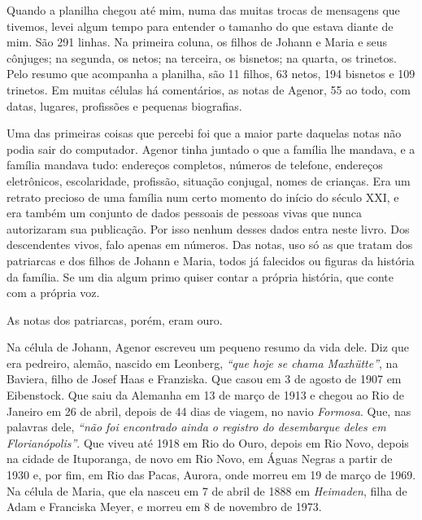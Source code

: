 \documentclass[
  brazilian,
  11pt,
  openany]{book}
\begin{document}
Quando a planilha chegou até mim, numa das muitas trocas de mensagens
que tivemos, levei algum tempo para entender o tamanho do que estava
diante de mim. São 291 linhas. Na primeira coluna, os filhos de Johann e
Maria e seus cônjuges; na segunda, os netos; na terceira, os bisnetos;
na quarta, os trinetos. Pelo resumo que acompanha a planilha, são 11
filhos, 63 netos, 194 bisnetos e 109 trinetos. Em muitas células há
comentários, as notas de Agenor, 55 ao todo, com datas, lugares,
profissões e pequenas biografias.

Uma das primeiras coisas que percebi foi que a maior parte daquelas
notas não podia sair do computador. Agenor tinha juntado o que a família
lhe mandava, e a família mandava tudo: endereços completos, números de
telefone, endereços eletrônicos, escolaridade, profissão, situação
conjugal, nomes de crianças. Era um retrato precioso de uma família num
certo momento do início do século XXI, e era também um conjunto de dados
pessoais de pessoas vivas que nunca autorizaram sua publicação. Por isso
nenhum desses dados entra neste livro. Dos descendentes vivos, falo
apenas em números. Das notas, uso só as que tratam dos patriarcas e dos
filhos de Johann e Maria, todos já falecidos ou figuras da história da
família. Se um dia algum primo quiser contar a própria história, que
conte com a própria voz.

As notas dos patriarcas, porém, eram ouro.

Na célula de Johann, Agenor escreveu um pequeno resumo da vida dele. Diz
que era pedreiro, alemão, nascido em Leonberg, \emph{``que hoje se chama
Maxhütte''}, na Baviera, filho de Josef Haas e Franziska. Que casou em 3
de agosto de 1907 em Eibenstock. Que saiu da Alemanha em 13 de março de
1913 e chegou ao Rio de Janeiro em 26 de abril, depois de 44 dias de
viagem, no navio \emph{Formosa}. Que, nas palavras dele, \emph{``não foi
encontrado ainda o registro do desembarque deles em Florianópolis''}.
Que viveu até 1918 em Rio do Ouro, depois em Rio Novo, depois na cidade
de Ituporanga, de novo em Rio Novo, em Águas Negras a partir de 1930 e,
por fim, em Rio das Pacas, Aurora, onde morreu em 19 de março de 1969.
Na célula de Maria, que ela nasceu em 7 de abril de 1888 em
\emph{Heimaden}, filha de Adam e Franciska Meyer, e morreu em 8 de
novembro de 1973.
\end{document}
